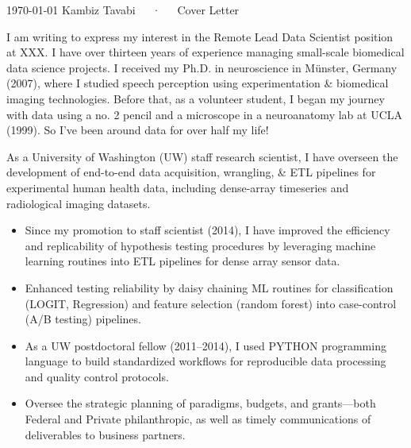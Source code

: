 \documentclass[11pt, letterpaper]{russell}
\begin{document}
\makecvheader[R]

\makecvfooter
{\today}
{Kambiz Tavabi~~~·~~~Cover Letter}
{\thepage}

\makelettertitle

\begin{cvletter}
  I am writing to express my interest in the Remote Lead Data Scientist position at XXX. I have over thirteen years of experience managing small-scale biomedical data science projects. I received my Ph.D. in neuroscience in Münster, Germany (2007), where I studied speech perception using experimentation \& biomedical imaging technologies. Before that, as a volunteer student, I began my journey with data using a no. 2 pencil and a microscope in a neuroanatomy lab at UCLA (1999). So I've been around data for over half my life! 

  As a University of Washington (UW) staff research scientist, I have overseen the development of end-to-end data acquisition, wrangling, \& ETL pipelines for experimental human health data, including dense-array timeseries and radiological imaging datasets.

  \begin{itemize}
    \item Since my promotion to staff scientist (2014), I have improved the efficiency and replicability of hypothesis testing procedures by leveraging machine learning routines into ETL pipelines for dense array sensor data.
    \item Enhanced testing reliability by daisy chaining ML routines for classification (LOGIT, Regression) and feature selection (random forest) into case-control (A/B testing) pipelines.
    \item As a UW postdoctoral fellow (2011--2014), I used PYTHON programming language to build standardized workflows for reproducible data processing and quality control protocols.
    \item Oversee the strategic planning of paradigms, budgets, and grants---both Federal and Private philanthropic, as well as timely communications of deliverables to business partners.
  \end{itemize}


\end{cvletter}
\end{document}
